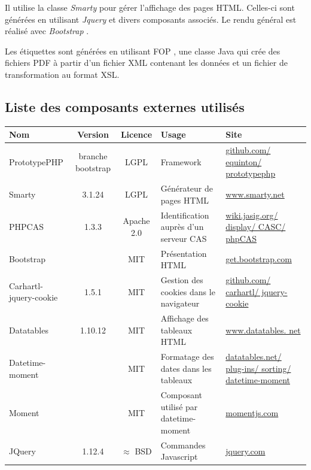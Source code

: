 Il utilise la classe \textit{Smarty} \cite{smarty} pour gérer l'affichage des pages HTML. Celles-ci sont générées en utilisant \textit{Jquery} \cite{jquery}  et divers composants associés. Le rendu général est réalisé avec \textit{Bootstrap} \cite{bootstrap}.

Les étiquettes sont générées en utilisant FOP \cite{fop}, une classe Java qui crée des fichiers PDF à partir d'un fichier XML contenant les données et un fichier de transformation au format XSL.

\subsection{Liste des composants externes utilisés}
\begin{longtable}{|>{\raggedright\arraybackslash}p{3cm}|c|c|>{\raggedright\arraybackslash}p{3cm}|>{\raggedright\arraybackslash}p{3cm}|}
\hline 
\textbf{Nom} & \textbf{Version} & \textbf{Licence} & \textbf{Usage} & \textbf{Site} \\ 
\hline 
\endhead
PrototypePHP & branche bootstrap & LGPL & Framework & \href{https://github.com/equinton/prototypephp}{github.com/ equinton/ prototypephp} \\ 
\hline 
Smarty & 3.1.24 & LGPL & Générateur de pages HTML & \href{http://www.smarty.net}{www.smarty.net} \\ 
\hline 
PHPCAS & 1.3.3 & Apache 2.0 & Identification auprès d'un serveur CAS & \href{https://wiki.jasig.org/display/CASC/phpCAS}{wiki.jasig.org/ display/ CASC/ phpCAS} \\ 
\hline 
Bootstrap &  & MIT & Présentation HTML & \href{http://getbootstrap.com}{get.bootstrap.com} \\ 
\hline 
Carhartl-jquery-cookie & 1.5.1 & MIT & Gestion des cookies dans le navigateur & \href{https://github.com/carhartl/jquery-cookie}{github.com/ carhartl/ jquery-cookie} \\ 
\hline 
Datatables & 1.10.12 & MIT & Affichage des tableaux HTML & \href{http://www.datatables.net/}{www.datatables. net} \\ 
\hline 
Datetime-moment &  & MIT & Formatage des dates dans les tableaux & \href{https://datatables.net/plug-ins/sorting/datetime-moment}{datatables.net/ plug-ins/ sorting/ datetime-moment} \\ 
\hline 
Moment &  & MIT & Composant utilisé par datetime-moment & \href{http://momentjs.com} {momentjs.com}\\ 
\hline 
JQuery & 1.12.4 & $\approx$ BSD & Commandes Javascript & \href{http://jquery.com/}{jquery.com} \\ 

\end{longtable}
